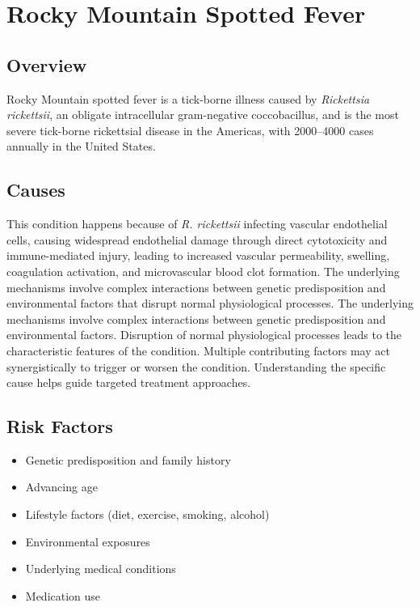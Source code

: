 \chapter{Rocky Mountain Spotted Fever}
\label{sec:Rocky Mountain Spotted Fever}

\section{Overview}
Rocky Mountain spotted fever is a tick-borne illness caused by \textit{Rickettsia rickettsii}, an obligate intracellular gram-negative coccobacillus, and is the most severe tick-borne rickettsial disease in the Americas, with 2000--4000 cases annually in the United States.
\section{Causes}
This condition happens because of \textit{R. rickettsii} infecting vascular endothelial cells, causing widespread endothelial damage through direct cytotoxicity and immune-mediated injury, leading to increased vascular permeability, swelling, coagulation activation, and microvascular blood clot formation. The underlying mechanisms involve complex interactions between genetic predisposition and environmental factors that disrupt normal physiological processes. The underlying mechanisms involve complex interactions between genetic predisposition and environmental factors. Disruption of normal physiological processes leads to the characteristic features of the condition. Multiple contributing factors may act synergistically to trigger or worsen the condition. Understanding the specific cause helps guide targeted treatment approaches.
\section{Risk Factors}


\begin{itemize}[noitemsep]
  \item Genetic predisposition and family history
  \item Advancing age
  \item Lifestyle factors (diet, exercise, smoking, alcohol)
  \item Environmental exposures
  \item Underlying medical conditions
  \item Medication use
\end{itemize}
